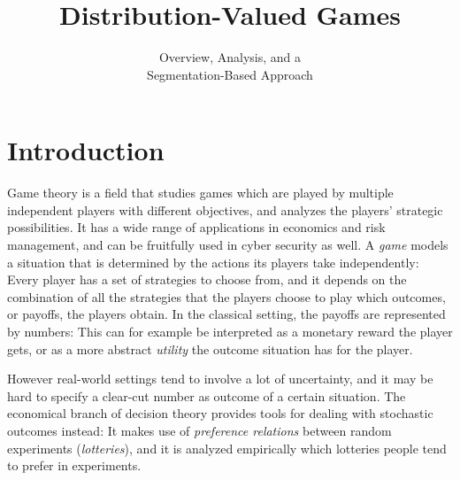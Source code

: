 \documentclass[a4paper,DIV=11]{scrreprt}
\title{\huge Distribution-Valued Games}
\subtitle{\LARGE Overview, Analysis, and a \\Segmentation-Based Approach}
\theoremstyle{definition}
\begin{document}
    \maketitle
    \tableofcontents
    
    \chapter{Introduction}
    Game theory is a field that studies games which are played by multiple independent players with different objectives, and analyzes the players' strategic possibilities.
    It has a wide range of applications in economics and risk management, and can be fruitfully used in cyber security as well.
    A \emph{game} models a situation that is determined by the actions its players take independently: Every player has a set of strategies to choose from, and it depends on the combination of all the strategies that the players choose to play which outcomes, or payoffs, the players obtain. In the classical setting, the payoffs are represented by numbers: This can for example be interpreted as a monetary reward the player gets, or as a more abstract \emph{utility} the outcome situation has for the player.
    
    However real-world settings tend to involve a lot of uncertainty, and it may be hard to specify a clear-cut number as outcome of a certain situation. The economical branch of decision theory provides tools for dealing with stochastic outcomes instead: It makes use of \emph{preference relations} between random experiments (\emph{lotteries}), and it is analyzed empirically which lotteries people tend to prefer in experiments.
    
\end{document}
